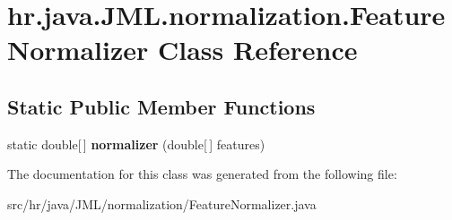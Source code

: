 \hypertarget{classhr_1_1java_1_1_j_m_l_1_1normalization_1_1_feature_normalizer}{\section{hr.\+java.\+J\+M\+L.\+normalization.\+Feature\+Normalizer Class Reference}
\label{classhr_1_1java_1_1_j_m_l_1_1normalization_1_1_feature_normalizer}
}
\subsection*{Static Public Member Functions}
\begin{DoxyCompactItemize}
\item 
\hypertarget{classhr_1_1java_1_1_j_m_l_1_1normalization_1_1_feature_normalizer_ad0dc45ee779d52a913fa23de1a9129fc}{static double\mbox{[}$\,$\mbox{]} {\bfseries normalizer} (double\mbox{[}$\,$\mbox{]} features)}\label{classhr_1_1java_1_1_j_m_l_1_1normalization_1_1_feature_normalizer_ad0dc45ee779d52a913fa23de1a9129fc}

\end{DoxyCompactItemize}


The documentation for this class was generated from the following file\+:\begin{DoxyCompactItemize}
\item 
src/hr/java/\+J\+M\+L/normalization/Feature\+Normalizer.\+java\end{DoxyCompactItemize}
